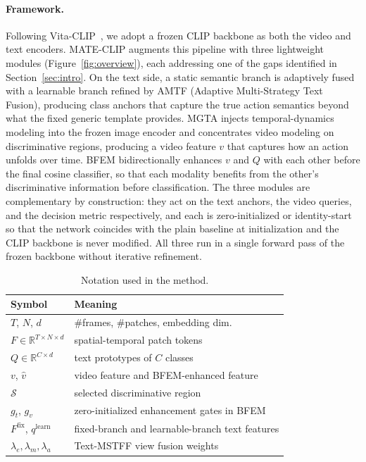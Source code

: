 \paragraph{Framework.}
Following Vita-CLIP~\cite{wasim2023vitaclip}, we adopt a frozen CLIP backbone as both the video and text encoders.
MATE-CLIP augments this pipeline with three lightweight modules (Figure~\ref{fig:overview}), each addressing one of the gaps identified in Section~\ref{sec:intro}.
On the text side, a static semantic branch is adaptively fused with a learnable branch refined by AMTF (Adaptive Multi-Strategy Text Fusion), producing class anchors that capture the true action semantics beyond what the fixed generic template provides.
MGTA injects temporal-dynamics modeling into the frozen image encoder and concentrates video modeling on discriminative regions, producing a video feature $v$ that captures how an action unfolds over time.
BFEM bidirectionally enhances $v$ and $Q$ with each other before the final cosine classifier, so that each modality benefits from the other's discriminative information before classification.
The three modules are complementary by construction: they act on the text anchors, the video queries, and the decision metric respectively, and each is zero-initialized or identity-start so that the network coincides with the plain baseline at initialization and the CLIP backbone is never modified.
All three run in a single forward pass of the frozen backbone without iterative refinement.

\begin{table}[t]
  \centering
  \footnotesize
  \begin{tabular}{ll}
    \hline
    Symbol & Meaning \\
    \hline
    $T$, $N$, $d$ & \#frames, \#patches, embedding dim. \\
    $F \in \mathbb{R}^{T \times N \times d}$ & spatial-temporal patch tokens \\
    $Q \in \mathbb{R}^{C \times d}$ & text prototypes of $C$ classes \\
    $v$, $\hat{v}$ & video feature and BFEM-enhanced feature \\
    $\mathcal{S}$ & selected discriminative region \\
    $g_t$, $g_v$ & zero-initialized enhancement gates in BFEM \\
    $F^{\text{fix}}$, $q^{\text{learn}}$ & fixed-branch and learnable-branch text features \\
    $\lambda_{e}, \lambda_{m}, \lambda_{a}$ & Text-MSTFF view fusion weights \\
    \hline
  \end{tabular}
  \caption{Notation used in the method.}
  \label{tab:notation}
\end{table}

